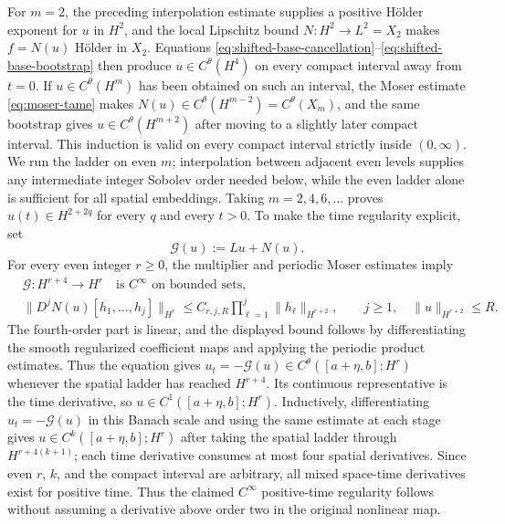 \documentclass[11pt]{article}
\numberwithin{equation}{section}
\theoremstyle{definition}
\begin{document}
For $m=2$, the preceding interpolation estimate supplies a positive Hölder
exponent for $u$ in $H^2$, and the local Lipschitz bound
$N:H^2\to L^2=X_2$ makes $f=N(u)$ Hölder in $X_2$.  Equations
\eqref{eq:shifted-base-cancellation}--\eqref{eq:shifted-base-bootstrap} then
produce $u\in C^\theta(H^4)$ on every compact interval away from $t=0$.
If $u\in C^\theta(H^m)$ has been obtained on such an interval, the Moser
estimate \eqref{eq:moser-tame} makes $N(u)\in C^\theta(H^{m-2})=C^\theta(X_m)$,
and the same bootstrap gives $u\in C^\theta(H^{m+2})$ after moving to a
slightly later compact interval.  This induction is valid on every compact
interval strictly inside $(0,\infty)$.  We run the ladder on even $m$;
interpolation between adjacent even levels supplies any intermediate integer
Sobolev order needed below, while the even ladder alone is sufficient for all
spatial embeddings.  Taking $m=2,4,6,\ldots$ proves
$u(t)\in H^{2+2q}$ for every $q$ and every $t>0$.  To make the time
regularity explicit, set
\begin{equation}
 \mathcal G(u):=Lu+N(u).
 \label{eq:temporal-bootstrap-map}
\end{equation}
For every even integer $r\ge0$, the multiplier and periodic Moser estimates imply
\begin{equation}
 \begin{aligned}
  &\mathcal G:H^{r+4}\longrightarrow H^r
       \quad\text{is $C^\infty$ on bounded sets},\\
  &\|D^jN(u)[h_1,\ldots,h_j]\|_{H^r}
       \le C_{r,j,R}\prod_{\ell=1}^j\|h_\ell\|_{H^{r+2}},
       \qquad j\ge1,
       \quad\|u\|_{H^{r+2}}\le R.
 \end{aligned}
 \label{eq:temporal-derivative-bound}
\end{equation}
The fourth-order part is linear, and the displayed bound follows by
 differentiating the smooth regularized coefficient maps and applying the
 periodic product estimates.  Thus the equation gives
 $u_t=-\mathcal G(u)\in C^\theta([a+\eta,b];H^r)$ whenever the spatial ladder
 has reached $H^{r+4}$.  Its continuous representative is the time
 derivative, so $u\in C^1([a+\eta,b];H^r)$.  Inductively, differentiating
 $u_t=-\mathcal G(u)$ in this Banach scale and using the same estimate at each
 stage gives $u\in C^k([a+\eta,b];H^r)$ after taking the spatial ladder through
 $H^{r+4(k+1)}$; each time derivative consumes at most four spatial
 derivatives.  Since even $r$, $k$, and the compact interval are arbitrary, all
 mixed space-time derivatives exist for positive time.  Thus the claimed
 $C^\infty$ positive-time regularity follows without assuming a derivative
 above order two in the original nonlinear map.
\end{document}
